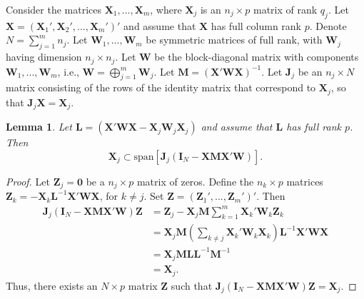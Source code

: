 \documentclass{article}\usepackage[]{graphicx}\usepackage[]{color}
\newcommand{\bm}{\mathbf}
\newtheorem*{lem}{Lemma}
\begin{document}
\def\spacingset#1{\renewcommand{\baselinestretch}%
{#1}\small\normalsize} \spacingset{1}

Consider the matrices $\bm{X}_1,...,\bm{X}_m$, where $\bm{X}_j$ is an $n_j \times p$ matrix of rank $q_j$. Let $\bm{X} = \left(\bm{X}_1', \bm{X}_2',...,\bm{X}_m'\right)'$ and assume that $\bm{X}$ has full column rank $p$. Denote $N = \sum_{j=1}^m n_j$. Let $\bm{W}_1,...,\bm{W}_m$ be symmetric matrices of full rank, with $\bm{W}_j$ having dimension $n_j \times n_j$. Let $\bm{W}$ be the block-diagonal matrix with components $\bm{W}_1,...,\bm{W}_m$, i.e., $\bm{W}  = \bigoplus_{j=1}^m \bm{W}_j$. Let $\bm{M} = \left(\bm{X}'\bm{W}\bm{X}\right)^{-1}$. Let $\bm{J}_j$ be an $n_j \times N$ matrix consisting of the rows of the identity matrix that correspond to $\bm{X}_j$, so that $\bm{J}_j\bm{X} = \bm{X}_j$. 

\begin{lem}
Let $\bm{L} = \left(\bm{X}'\bm{W}\bm{X} - \bm{X}_j \bm{W}_j \bm{X}_j\right)$ and assume that $\bm{L}$ has full rank $p$. Then \[
\bm{X}_j \subset \text{span}\left[\bm{J}_j \left(\bm{I}_N - \bm{X}\bm{M}\bm{X}'\bm{W}\right)\right].\]
\end{lem}

\begin{proof}
Let $\bm{Z}_j = \bm{0}$ be a $n_j \times p$ matrix of zeros. Define the $n_k \times p$ matrices $\bm{Z}_k = - \bm{X}_k \bm{L}^{-1}\bm{X}'\bm{W}\bm{X}$, for $k \neq j$. Set $\bm{Z} = \left(\bm{Z}_1',...,\bm{Z}_m'\right)'$. Then 
\begin{align*}
\bm{J}_j\left(\bm{I}_N - \bm{X}\bm{M}\bm{X}'\bm{W}\right) \bm{Z} &= \bm{Z}_j - \bm{X}_j\bm{M}\sum_{k=1}^m \bm{X}_k'\bm{W}_k\bm{Z}_k \\
&= \bm{X}_j \bm{M} \left(\sum_{k \neq j} \bm{X}_k'\bm{W}_k \bm{X}_k\right) \bm{L}^{-1}\bm{X}'\bm{W}\bm{X} \\
&= \bm{X}_j \bm{M} \bm{L} \bm{L}^{-1} \bm{M}^{-1} \\
&= \bm{X}_j.
\end{align*}
Thus, there exists an $N \times p$ matrix $\bm{Z}$ such that $\bm{J}_j \left(\bm{I}_N - \bm{X}\bm{M}\bm{X}'\bm{W}\right)\bm{Z} = \bm{X}_j$.

\end{proof}
\end{document}
